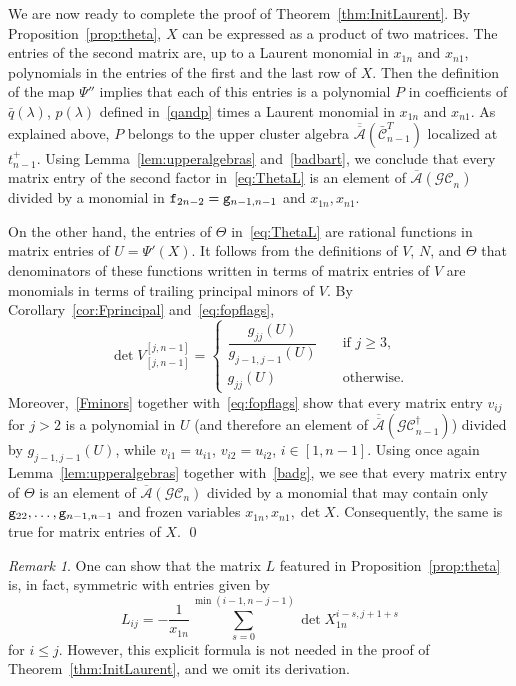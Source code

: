 \documentclass{amsart}
\theoremstyle{definition}
\theoremstyle{remark}
\newtheorem{remark}[theorem]{Remark}
\numberwithin{equation}{section}
\numberwithin{theorem}{section}
\def\A{{\mathcal A}}
\def\CC{{\mathcal C}}
\def\G{{\mathcal G}}
\def\GCC{{\G\CC}}
\def\UC{\overline{\A}}
\def\ef{{\tt f}}
\def\eg{{\tt g}}
\begin{document}
We are now ready to complete the proof of Theorem~\ref{thm:InitLaurent}. By Proposition~\ref{prop:theta}, $X$ can be expressed as a product of two matrices. The entries of the second matrix are, up to a Laurent monomial in $x_{1n}$ 
and $x_{n1}$, polynomials in the entries of the first and the last row of $X$. Then the definition of the map $\Psi''$ implies that each of this entries is a polynomial $P$ in coefficients of $\bar q(\lambda)$, $p(\lambda)$  defined in~\eqref{qandp} times a Laurent monomial in $x_{1n}$ and $x_{n1}$. As explained above, $P$ belongs to the upper cluster algebra $\overline{\UC}(\bar\CC_{n-1}^T)$ localized at $t^+_{n-1}$. Using Lemma~\ref{lem:upperalgebras} 
and~\eqref{badbart}, we conclude that every matrix entry of the second factor in~\eqref{eq:ThetaL} is an element of 
$\UC(\GCC_n)$ divided by a monomial in $\ef_{2n-2}=\eg_{n-1,n-1}$ and $x_{1n}, x_{n1}$.


On the other hand, the entries of  $\Theta$ in~\eqref{eq:ThetaL} are rational functions in matrix entries of 
$U=\Psi'(X)$. It follows from the definitions of $V$, $N$, and $\Theta$ that denominators of these functions written in terms of matrix entries of $V$ are monomials in terms of  trailing principal minors of $V$. 
By Corollary~\ref{cor:Fprincipal} and~\eqref{eq:fopflags}, 
\[
\det V_{[j,n-1]}^{[j,n-1]} = \begin{cases}
    \dfrac{g_{jj}(U)}{g_{j-1,j-1}(U)} \quad &\text{if $j\geq 3$},\\
    g_{jj}(U) \quad &\text{otherwise}.
\end{cases}
\]
Moreover,~\eqref{Fminors} together with~\eqref{eq:fopflags} show that every matrix entry  $v_{ij}$ for $j>2$ is a polynomial in $U$ (and therefore an element of $\overline{\UC}(\GCC_{n-1}^\dag)$) divided by $g_{j-1,j-1}(U)$, while 
$v_{i1}=u_{i1}$, $v_{i2}=u_{i2}$, $i\in[1, n-1]$. 
Using once again Lemma~\ref{lem:upperalgebras} together with~\eqref{badg}, we see that every matrix entry of $\Theta$ is an element of $\UC(\G\CC_n)$ divided by a monomial that may contain only $\eg_{22},\ldots,\eg_{n-1,n-1}$ and frozen variables $x_{1n}, x_{n1}, \det X$. Consequently, the same is true for matrix entries of $X$. \qed



\begin{remark} 
One can show that the matrix $L$ featured in Proposition~\ref{prop:theta} is, in fact, symmetric with  entries given by
\[
L_{ij} = -\frac{1}{x_{1n}} \sum_{s=0}^{\min (i-1,n-j-1)} \det X_{1n}^{i-s,j+1+s}
\]
for $i\leq j$. However, this explicit formula is not needed in the proof of Theorem~\ref{thm:InitLaurent}, and we omit its derivation.
\end{remark}
\end{document}
